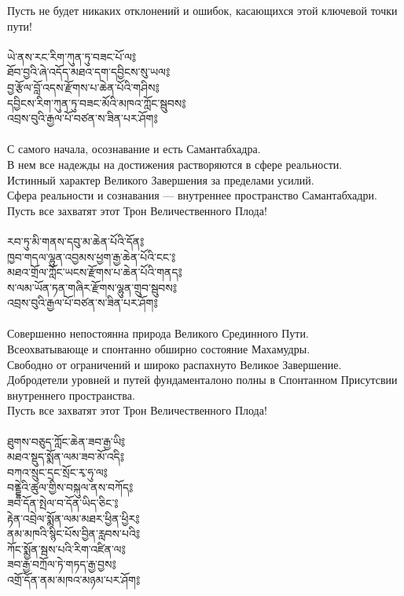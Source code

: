 Пусть не будет никаких отклонений и ошибок, касающихся этой ключевой точки пути!\\
\\
\newpage
{\ti ཡེ་ནས་རང་རིག་ཀུན་ཏུ་བཟང་པོ་ལ༔\\
ཐོབ་བྱའི་ཞེ་འདོད་མཐའ་དག་དབྱིངས་སུ་ཡལ༔\\
བྱ་རྩོལ་བློ་འདས་རྫོགས་པ་ཆེན་པོའི་གཤིས༔\\
དབྱིངས་རིག་ཀུན་ཏུ་བཟང་མོའི་མཁའ་ཀློང་སྦུབས༔\\
འབྲས་བུའི་རྒྱལ་པོ་བཙན་ས་ཟིན་པར་ཤོག༔}\\
\\
\ru
С самого начала, осознавание и есть Самантабхадра.\\
В нем все надежды на достижения растворяются в сфере реальности.\\
Истинный характер Великого Завершения за пределами усилий.\\
Сфера реальности и сознавания — внутреннее пространство Самантабхадри.\\
Пусть все захватят этот Трон Величественного Плода!\\
\\
{\ti རབ་ཏུ་མི་གནས་དབུ་མ་ཆེན་པོའི་དོན༔\\
ཁྱབ་གདལ་ལྷུན་འབྱམས་ཕྱག་རྒྱ་ཆེན་པོའི་ངང༌༔\\
མཐའ་གྲོལ་ཀློང་ཡངས་རྫོགས་པ་ཆེན་པོའི་གནད༔\\
ས་ལམ་ཡོན་ཏན་གཞིར་རྫོགས་ལྷུན་གྲུབ་སྦུབས༔\\
འབྲས་བུའི་རྒྱལ་པོ་བཙན་ས་ཟིན་པར་ཤོག༔}\\
\\
\ru
Совершенно непостоянна природа Великого Срединного Пути.\\
Всеохватывающе и спонтанно обширно состояние Махамудры.\\
Свободно от ограничений и широко распахнуто Великое Завершение.\\
Добродетели уровней и путей фундаменталоно полны в Спонтанном Присутсвии внутреннего пространства.\\
Пусть все захватят этот Трон Величественного Плода!\\
\\
\newpage
{\ti ཐུགས་བཅུད་ཀློང་ཆེན་ཟབ་རྒྱ་ཡི༔\\
མཐའ་སྡུད་སྨོན་ལམ་ཟབ་མོ་འདི༔\\
བཀའ་སྲུང་དྲང་སྲོང་རྭ་ཧུ་ལ༔\\
བནྡྷེའི་ཚུལ་གྱིས་བསྐུལ་ནས་བཀོད༔\\
ཟབ་དོན་སྤེལ་བ་དོན་ཡིད་ཅིང༌༔\\
རྟེན་འབྲེལ་སྨོན་ལམ་མཐར་ཕྱིན་ཕྱིར༔\\
ནམ་མཁའི་སྙིང་པོས་བྱིན་རླབས་པའི༔\\
ཀོང་སྨྱོན་སྦས་པའི་རིག་འཛིན་ལ༔\\
ཟབ་རྒྱ་བཀྲོལ་ཏེ་གཏད་རྒྱ་བྱས༔\\
འགྲོ་དོན་ནམ་མཁའ་མཉམ་པར་ཤོག༔}\\
